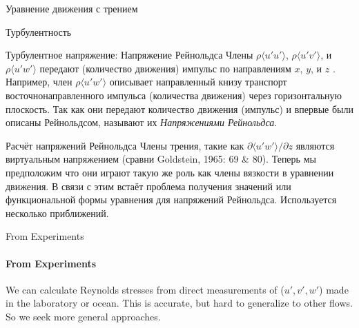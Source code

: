 \begin{chapter}{Уравнение движения с трением}
\begin{section}{Турбулентность}
\begin{paragraph}{Турбулентное напряжение: Напряжение Рейнольдса}
Члены $\rho{\langle u' u' \rangle}$, $\rho{\langle u' v'\rangle}$, и
$\rho{\langle u' w' \rangle}$ передают (количество движения) импульс
по направлениям $x$, $y$, и $z$ . 
Например, член $\rho{\langle u' w'\rangle}$ описывает направленный
книзу транспорт восточнонаправленного импульса (количества движения)
через горизонтальную плоскость. Так как они передают количество
движения (импульс) и впервые были описаны Рейнольдсом, называют их
\emph{Напряжениями Рейнольдса}.
%
\end{paragraph}
\end{section}

\begin{section}{Расчёт напряжений Рейнольдса}
Члены трения, такие как $\partial{\langle u'w'\rangle}/\partial{z}$
являются виртуальным напряжением (сравни Goldstein, 1965: 69 \& 80). 
Теперь мы предположим что они играют такую же роль как члены
вязкости в уравнении движения. В связи с этим встаёт проблема
получения значений или функциональной формы уравнения для напряжений
Рейнольдса. Используется несколько приближений.
%

\begin{paragraph}{From Experiments}
\paragraph{From Experiments}
We can calculate Reynolds stresses from direct measurements of ($u',
v', w'$) made in the laboratory or ocean. This is accurate, but hard
to generalize to other flows. So we seek more general approaches.
%
\end{paragraph}


\end{section}
\end{chapter}

